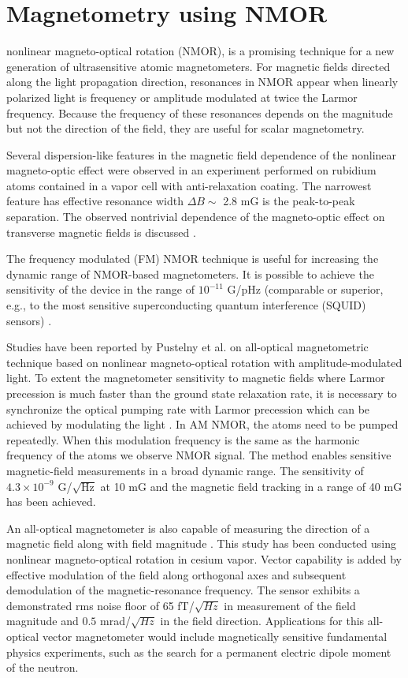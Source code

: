 \section{Magnetometry using NMOR\label{sec:magnetometry literature review}}

nonlinear magneto-optical rotation (NMOR), is a promising technique for a new generation of ultrasensitive atomic magnetometers. For magnetic fields directed along the light propagation direction, resonances in NMOR appear when linearly polarized light is frequency or amplitude modulated at twice the Larmor frequency. Because the frequency of these resonances depends on the magnitude but not the direction of the field, they are useful for scalar magnetometry.

 Several dispersion-like features in the magnetic field dependence of the nonlinear magneto-optic effect
were observed in an experiment performed on rubidium atoms contained in a vapor cell with anti-relaxation
coating. The narrowest feature has effective resonance width $\Delta B \sim$ 2.8 mG is the
peak-to-peak separation. The observed nontrivial dependence of the magneto-optic effect on transverse
magnetic fields is discussed \cite{bib:UltranarrowWidths}.

The frequency modulated (FM) NMOR technique is useful for increasing the dynamic range of NMOR-based magnetometers.  It is possible to achieve the  sensitivity of the device in the range of  $10^{−11} $ G/pHz (comparable or superior, e.g., to the most sensitive superconducting quantum interference (SQUID) sensors)  \cite{bib:FMNMOR}.

 Studies have been reported by  Pustelny et al. \cite{bib:AMNMOR,bib:amNMOR} on all-optical magnetometric technique based on nonlinear magneto-optical rotation with amplitude-modulated light. To extent the magnetometer sensitivity to magnetic fields where Larmor
precession is much faster than the ground state relaxation rate, it is
necessary to synchronize the optical pumping rate with Larmor
precession which can be achieved by modulating the light
\cite{doi:10.1063/1.3225917}. In AM NMOR, the atoms need to be pumped repeatedly. When this modulation frequency is the same as the harmonic
frequency of the atoms we observe NMOR signal. The method enables sensitive magnetic-field measurements in a broad dynamic range. The sensitivity of  $4.3\times10^{-9}$ G/$\sqrt{\text{Hz}}$ at 10 mG and the magnetic field tracking in a range of 40 mG has been achieved. 

An all-optical magnetometer is also capable of measuring the direction of a magnetic field along with field magnitude \cite{bib:vectormagnetometer}.  This study has been conducted using nonlinear magneto-optical rotation in cesium vapor.  Vector capability is added by effective modulation of the field along orthogonal axes and subsequent demodulation of the magnetic-resonance frequency.  The sensor exhibits a demonstrated rms noise floor of   65 fT/$\sqrt {Hz}$ in measurement of the field magnitude and $ 0.5$  mrad/$\sqrt {Hz}$ in the field direction.  Applications for this all-optical vector magnetometer would include magnetically sensitive fundamental physics experiments, such as the search for a permanent electric dipole moment of the neutron. 

